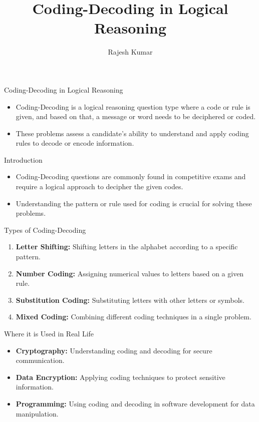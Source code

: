 \title{Coding-Decoding in Logical Reasoning}
\author{Rajesh Kumar}
\date{}

\begin{frame}
  \titlepage
\end{frame}

\begin{frame}{Coding-Decoding in Logical Reasoning}
  \begin{itemize}
    \item Coding-Decoding is a logical reasoning question type where a code or rule is given, and based on that, a message or word needs to be deciphered or coded.
    \item These problems assess a candidate's ability to understand and apply coding rules to decode or encode information.
  \end{itemize}
\end{frame}

\begin{frame}{Introduction}
  \begin{itemize}
    \item Coding-Decoding questions are commonly found in competitive exams and require a logical approach to decipher the given codes.
    \item Understanding the pattern or rule used for coding is crucial for solving these problems.
  \end{itemize}
\end{frame}

\begin{frame}{Types of Coding-Decoding}
  \begin{enumerate}
    \item \textbf{Letter Shifting:} Shifting letters in the alphabet according to a specific pattern.
    \item \textbf{Number Coding:} Assigning numerical values to letters based on a given rule.
    \item \textbf{Substitution Coding:} Substituting letters with other letters or symbols.
    \item \textbf{Mixed Coding:} Combining different coding techniques in a single problem.
  \end{enumerate}
\end{frame}

\begin{frame}{Where it is Used in Real Life}
  \begin{itemize}
    \item \textbf{Cryptography:} Understanding coding and decoding for secure communication.
    \item \textbf{Data Encryption:} Applying coding techniques to protect sensitive information.
    \item \textbf{Programming:} Using coding and decoding in software development for data manipulation.
  \end{itemize}
\end{frame}

